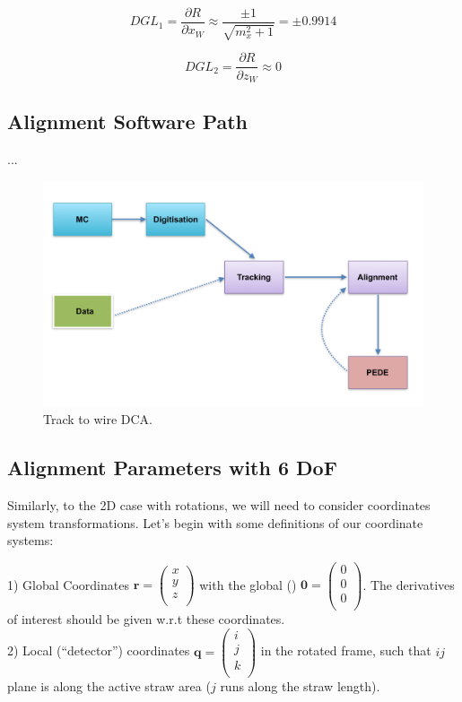 \documentclass[a4paper,11pt]{article}
\begin{document}
\begin{equation}	
DGL_1 = \frac{\partial R}{\partial x_W} \approx  \frac{\pm1}{\sqrt{m_x^2+1}} = \pm 0.9914
\end{equation}

\begin{equation}	
DGL_2 = \frac{\partial R}{\partial z_W} \approx  0
\end{equation}


\subsection{Alignment Software Path}

...

\begin{figure}[!ht]
\centering
\includegraphics[width=0.6\linewidth]{fig/AlignPath.png}
\caption{Track to wire DCA.}
\label{fig:AlignPath}
\end{figure}


\subsection{Alignment Parameters with 6 DoF}

Similarly, to the 2D case with rotations, we will need to consider coordinates system transformations. Let's begin with some definitions of our coordinate systems: 

1) Global Coordinates $\textbf{r}=\begin{pmatrix}x\\y\\z\\\end{pmatrix}$ with the global () $\textbf{0}=\begin{pmatrix}0\\0\\0\\\end{pmatrix}$. The derivatives of interest should be given w.r.t these coordinates. \\
2) Local (“detector”) coordinates  $\textbf{q}=\begin{pmatrix}i\\j\\k\\\end{pmatrix}$ in the rotated frame, such that $ij$ plane is along the active straw area ($j$ runs along the straw length). \\
\end{document}
